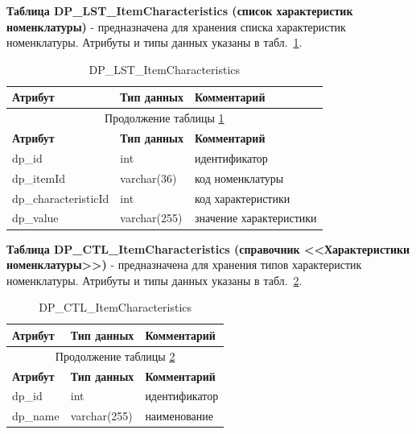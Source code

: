 \textbf{Таблица DP\_LST\_ItemCharacteristics (список характеристик номенклатуры)} - предназначена для хранения списка характеристик номенклатуры.
Атрибуты и типы данных указаны в табл.~\ref{tab:DP_LST_ItemCharacteristics}.

\begin{longtable}{|p{5.5cm}|p{3.5cm}|p{7.5cm}|}
    \caption{DP\_LST\_ItemCharacteristics} \label{tab:DP_LST_ItemCharacteristics} \\
    \hline
    \textbf{Атрибут} & \textbf{Тип данных} & \textbf{Комментарий} \\ \hline
    \endfirsthead

    \multicolumn{3}{c}{Продолжение таблицы \ref{tab:DP_LST_ItemCharacteristics}} \\
    \hline
    \textbf{Атрибут} & \textbf{Тип данных} & \textbf{Комментарий} \\ \hline
    \endhead

    \endfoot

    \endlastfoot
    dp\_id & int & идентификатор \\ \hline
    dp\_itemId & varchar(36) & код номенклатуры \\ \hline
    dp\_characteristicId & int & код характеристики \\ \hline
    dp\_value & varchar(255) & значение характеристики \\ \hline
\end{longtable}

\textbf{Таблица DP\_CTL\_ItemCharacteristics (справочник <<Характеристики номенклатуры>>)} - предназначена для хранения типов характеристик номенклатуры.
Атрибуты и типы данных указаны в табл.~\ref{tab:DP_CTL_Characteristics}.

\begin{longtable}{|p{5.5cm}|p{3.5cm}|p{7.5cm}|}
    \caption{DP\_CTL\_ItemCharacteristics} \label{tab:DP_CTL_Characteristics} \\
    \hline
    \textbf{Атрибут} & \textbf{Тип данных} & \textbf{Комментарий} \\ \hline
    \endfirsthead

    \multicolumn{3}{c}{Продолжение таблицы \ref{tab:DP_CTL_Characteristics}} \\
    \hline
    \textbf{Атрибут} & \textbf{Тип данных} & \textbf{Комментарий} \\ \hline
    \endhead

    \endfoot

    \endlastfoot
    dp\_id & int & идентификатор \\ \hline
    dp\_name & varchar(255) & наименование \\ \hline
\end{longtable}

